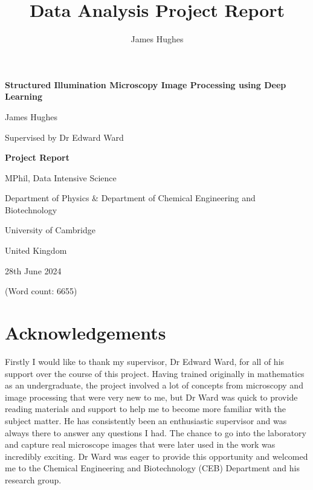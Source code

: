 \documentclass[12pt]{article}
\title{Data Analysis Project Report}
\author{James Hughes}
\begin{document}
\begin{titlepage}
    \begin{center}
        \vspace*{5cm}

        \Huge
        \textbf{Structured Illumination Microscopy Image Processing using Deep Learning}

        \vspace{0.5cm}
        \LARGE

        James Hughes

        Supervised by Dr Edward Ward

        \vspace{2cm}
        \Huge
        \textbf{Project Report}

        \vfill

        MPhil, Data Intensive Science

        \vspace{0.8cm}

        \Large
        Department of Physics \& Department of Chemical Engineering and Biotechnology

        University of Cambridge

        United Kingdom

        28th June 2024

        (Word count: 6655)

    \end{center}
\end{titlepage}


\newpage
\section*{Acknowledgements}

Firstly I would like to thank my supervisor, Dr Edward Ward, for all of his support over the course of this project.
Having trained originally in mathematics as an undergraduate,
the project involved a lot of concepts from microscopy and image processing that were very new to me,
but Dr Ward was quick to provide reading materials and support to help me to become more familiar with the subject matter.
He has consistently been an enthusiastic supervisor and was always there to answer any questions I had.
The chance to go into the laboratory and capture real microscope images that were later used in the work was incredibly exciting.
Dr Ward was eager to provide this opportunity and welcomed me to the Chemical Engineering and Biotechnology (CEB) Department and his research group.
\end{document}
